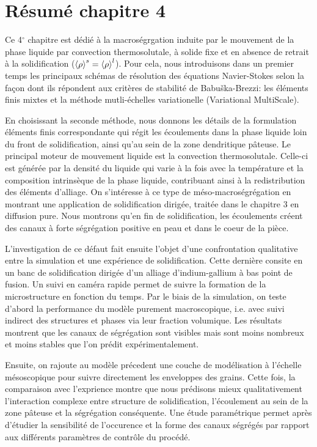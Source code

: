 \clearpage
\section*{Résumé chapitre 4}

Ce 4$^\circ$ chapitre est dédié à la macroségrgation induite par le mouvement de la phase liquide par convection thermosolutale,
à solide fixe et en absence de retrait à la solidification ($\left \langle \rho \right \rangle^s=\left \langle \rho \right \rangle^l$).
Pour cela, nous introduisons dans un premier temps les principaux schémas de résolution des équations Navier-Stokes selon la façon
dont ils répondent aux critères de stabilité de Babuška-Brezzi: les éléments finis
mixtes et la méthode mutli-échelles variationelle (Variational MultiScale). 

En choisissant la seconde méthode, nous donnons les détails de la formulation éléments finis correspondante qui régit les écoulements dans la phase liquide
loin du front de solidification, ainsi qu'au sein de la zone dendritique pâteuse. Le principal moteur de mouvement liquide est la convection thermosolutale.
Celle-ci est générée par la densité du liquide qui varie à la fois avec la température et la composition intrinsèque de la phase liquide, contribuant ainsi 
à la redistribution des éléments d'alliage.  
On s'intéresse à ce type de méso-macroségrégation en montrant une application de solidification dirigée, traitée dans le chapitre 3 en diffusion pure. 
Nous montrons qu'en fin de solidification, les écoulements créent des canaux à forte ségrégation positive en peau et dans le coeur de la pièce. 

L'investigation de ce défaut fait ensuite l'objet d'une confrontation qualitative entre la simulation et une expérience de solidification. Cette dernière consite en un 
banc de solidification dirigée d'un alliage d'indium-gallium à bas point de fusion. Un suivi en caméra rapide permet de suivre la formation de la microstructure
en fonction du temps. Par le biais de la simulation, on teste d'abord la performance du modèle purement macroscopique, i.e. avec suivi indirect 
des structures et phases via leur fraction volumique. Les résultats montrent que les canaux de ségrégation sont visibles mais sont moins nombreux et moins
stables que l'on prédit expérimentalement. 

Ensuite, on rajoute au modèle précedent une couche de modélisation à l'échelle mésoscopique pour suivre directement
les enveloppes des grains. Cette fois, la comparaison avec l'exprience montre que nous prédisons mieux qualitativement l'interaction complexe entre 
structure de solidification, l'écoulement au sein de la zone pâteuse et la ségrégation conséquente. Une étude paramétrique permet après d'étudier la sensibilité
de l'occurence et la forme des canaux ségrégés par rapport aux différents paramètres de contrôle du procédé.